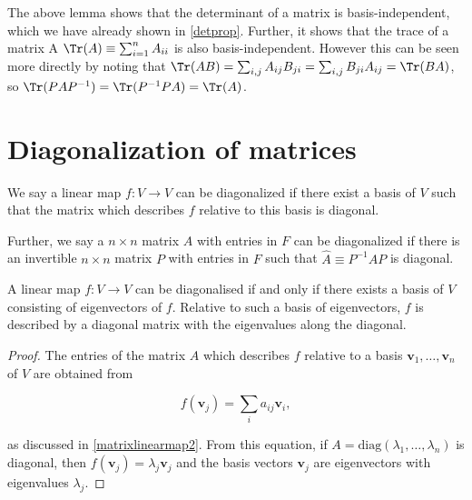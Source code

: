 \documentclass[a4paper,12pt]{report}
\begin{document}
The above lemma shows that the determinant of a matrix is basis-independent, which we have already shown in \cref{detprop}. Further, it shows that the trace of a matrix A \(\Tr (A) \equiv \sum_{i=1}^{n} A_{ii}\) is also basis-independent. However this can be seen more directly by noting that \(\Tr (AB) = \sum_{i,j}^{} A_{ij} B_{ji} = \sum_{i,j}^{} B_{ji} A_{ij} = \Tr (BA)      \), so \(\Tr (PAP^{-1} ) = \Tr (P^{-1} PA) = \Tr (A)\).

\section{Diagonalization of matrices}

\begin{definition}
We say a linear map \(f: V \rightarrow V\) can be diagonalized if there exist a basis of \(V\) such that the matrix which describes \(f\) relative to this basis is diagonal. 

Further, we say a \(n \times  n\) matrix \(A\) with entries in \(F\) can be diagonalized if there is an invertible \(n \times  n\) matrix \(P\) with entries in \(F\) such that \(\hat{A} \equiv P^{-1} AP \) is diagonal.   
\end{definition}

\begin{lemma}
A linear map \( f : V \to V \) can be diagonalised if and only if there exists a basis of \( V \) consisting of eigenvectors of \( f \). Relative to such a basis of eigenvectors, \( f \) is described by a diagonal matrix with the eigenvalues along the diagonal.
\end{lemma}

\begin{proof}
The entries of the matrix \( A \) which describes \( f \) relative to a basis \( \mathbf{v}_1, \ldots, \mathbf{v}_n \) of \( V \) are obtained from 

\begin{equation}
    f(\mathbf{v}_j) = \sum_i a_{ij} \mathbf{v}_i,
\end{equation}

as discussed in \cref{matrixlinearmap2}. From this equation, if \( A = \text{diag}(\lambda_1, \ldots, \lambda_n) \) is diagonal, then \( f(\mathbf{v}_j) = \lambda_j \mathbf{v}_j \) and the basis vectors \( \mathbf{v}_j \) are eigenvectors with eigenvalues \( \lambda_j \). 
\end{proof}
\end{document}
